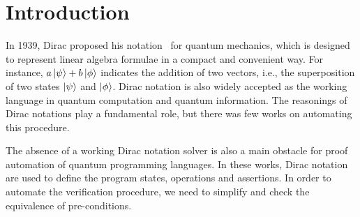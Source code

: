 \documentclass[runningheads]{llncs}
\begin{document}
\newcommand{\reduce}{\triangleright}

\newcommand{\Sort}{\mathsf{Sort}}
\newcommand{\WF}{\mathcal{WF}}

\newcommand{\Index}{\mathsf{Index}}
\newcommand{\Type}{\mathsf{Type}}
\newcommand{\Basis}{\mathsf{Basis}}

\newcommand{\SType}{\mathcal{S}}
\newcommand{\KType}{\mathcal{K}}
\newcommand{\BType}{\mathcal{B}}
\newcommand{\OType}{\mathcal{O}}
\newcommand{\SET}{\mathsf{Set}}

\newcommand{\ZEROK}{\mathbf{0}_\mathcal{K}}
\newcommand{\ZEROB}{\mathbf{0}_\mathcal{B}}
\newcommand{\ZEROO}{\mathbf{0}_\mathcal{O}}

\newcommand{\PAIR}{\mathsf{PAIR}}

\newcommand{\ZERO}{\mathsf{0}}
\newcommand{\ONE}{\mathsf{1}}
\newcommand{\ADDS}{\mathsf{ADDS}}
\newcommand{\ADD}{\mathsf{ADD}}
\newcommand{\MULS}{\mathsf{MULS}}
\newcommand{\MUL}{\mathsf{MUL}}
\newcommand{\CONJ}{\mathsf{CONJ}}
\newcommand{\CJG}{\mathsf{CJG}}
\newcommand{\ADJ}{\mathsf{ADJ}}
\newcommand{\DELTA}{\mathsf{DELTA}}
\newcommand{\DOT}{\mathsf{DOT}}
\newcommand{\SCR}{\mathsf{SCR}}
\newcommand{\TSR}{\mathsf{TSR}}
\newcommand{\KET}{\mathsf{KET}}
\newcommand{\BRA}{\mathsf{BRA}}
\newcommand{\ONEO}{\mathbf{1}_\mathcal{O}}
\newcommand{\OUTER}{\mathsf{OUTER}}
\newcommand{\MULK}{\mathsf{MULK}}
\newcommand{\MULB}{\mathsf{MULB}}
\newcommand{\MULO}{\mathsf{MULO}}


\section{Introduction}

In 1939, Dirac proposed his notation~\cite{dirac1939new} for quantum mechanics, which is designed to represent linear algebra formulae in a compact and convenient way.
For instance, $a\ket{\psi} + b\ket{\phi}$ indicates the addition of two vectors, i.e., the superposition of two states $\ket{\psi}$ and $\ket{\phi}$.
Dirac notation is also widely accepted as the working language in quantum computation and quantum information.
The reasonings of Dirac notations play a fundamental role, but there was few works on automating this procedure.


The absence of a working Dirac notation solver is also a main obstacle for proof automation of quantum programming languages.
In these works, Dirac notation are used to define the program states, operations and assertions. In order to automate the verification procedure,
we need to simplify and check the equivalence of pre-conditions. 
\end{document}
